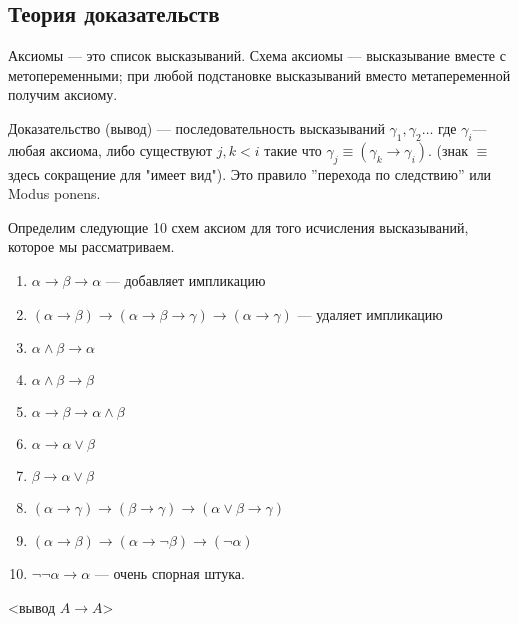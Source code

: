 \subsection{Теория доказательств}
\begin{definition}
    Аксиомы --- это список высказываний.
    Схема аксиомы --- высказывание вместе с метопеременными; при любой подстановке высказываний вместо метапеременной получим аксиому. 
\end{definition}

\begin{definition}
    Доказательство (вывод) --- последовательность высказываний $\gamma_1, \gamma_2\ldots$ где $\gamma_i$--- любая аксиома, 
    либо существуют $j,k < i$ такие что $\gamma_j \equiv (\gamma_k \to \gamma_i)$.
    (знак $\equiv$ здесь сокращение для "имеет вид"). Это правило ''перехода по следствию'' или Modus ponens.
\end{definition}

Определим следующие 10 схем аксиом для того исчисления высказываний, которое мы рассматриваем. 
\begin{enumerate}
    \item $\alpha \to \beta \to \alpha$ --- добавляет импликацию
    \item $(\alpha \to \beta) \to (\alpha \to \beta \to \gamma) \to (\alpha \to \gamma)$ --- удаляет импликацию
    \item $\alpha \land \beta \to \alpha$
    \item $\alpha \land \beta \to \beta$
    \item $\alpha \to \beta \to \alpha \land \beta$
    \item $\alpha \to \alpha \lor \beta$
    \item $\beta \to \alpha \lor \beta$
    \item $(\alpha \to \gamma) \to (\beta \to \gamma) \to (\alpha \lor \beta \to \gamma)$
    \item $(\alpha \to \beta) \to (\alpha \to \neg \beta) \to (\neg \alpha)$
    \item $\neg \neg \alpha \to \alpha$ --- очень спорная штука.
\end{enumerate}

<вывод $A\to A$>

